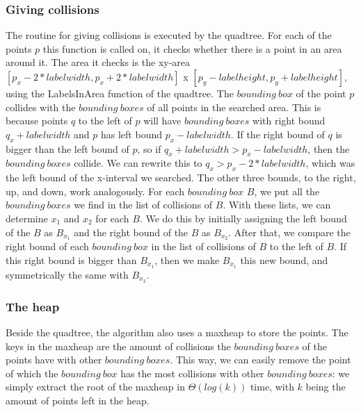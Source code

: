 \documentclass[crop=false,a4paper,oneside,11pt]{article}
\begin{document}
\subsubsection{Giving collisions}
The routine for giving collisions is executed by the quadtree. For each of the points $p$ this function is called on, it checks whether there is a point in an area around it. The area it checks is the xy-area $[p_x - 2*labelwidth, p_x + 2*labelwidth]$ x $[p_y - labelheight, p_y + labelheight]$, using the LabelsInArea function of the quadtree. The $bounding \ box$ of the point $p$ collides with the $bounding \ boxes$ of all points in the searched area. This is because points $q$ to the left of $p$ will have $bounding \ boxes$ with right bound $q_x + labelwidth$ and $p$ has left bound $p_x - labelwidth$. If the right bound of $q$ is bigger than the left bound of $p$, so if $q_x + labelwidth > p_x - labelwidth$, then the $bounding \ boxes$ collide. We can rewrite this to $q_x > p_x - 2*labelwidth$, which was the left bound of the x-interval we searched. The other three bounds, to the right, up, and down, work analogously. For each $bounding \ box$ $B$, we put all the $bounding \ boxes$ we find in the list of collisions of $B$. With these lists, we can determine $x_1$ and $x_2$ for each $B$. We do this by initially assigning the left bound of the $B$ as $B_{x_1}$ and the right bound of the $B$ as $B_{x_2}$. After that, we compare the right bound of each $bounding \ box$ in the list of collisions of $B$ to the left of $B$. If this right bound is bigger than $B_{x_1}$, then we make $B_{x_1}$ this new bound, and symmetrically the same with $B_{x_2}$. 
\subsubsection{The heap}
Beside the quadtree, the algorithm also uses a maxheap to store the points. The keys in the maxheap are the amount of collisions the $bounding \ boxes$ of the points have with other $bounding \ boxes$. This way, we can easily remove the point of which the $bounding \ box$ has the most collisions with other $bounding \ boxes$: we simply extract the root of the maxheap in $\Theta(log (k))$ time, with $k$ being the amount of points left in the heap. 
\end{document}
